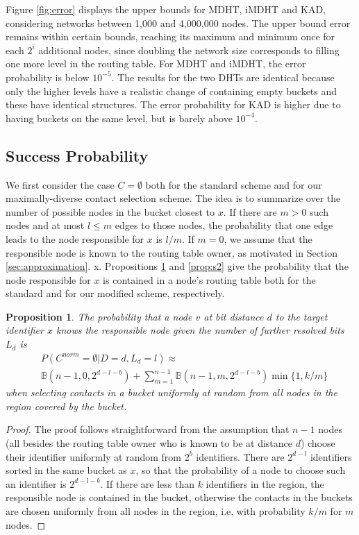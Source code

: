 \documentclass[10pt, conference, compsocconf, letterpaper]{IEEEtran}
\newcommand{\found}{\emptyset}
\renewcommand{\binom}{\mathbb{B}}
\newtheorem{proposition}{Proposition}
\begin{document}
Figure \ref{fig:error} displays the upper bounds for MDHT, iMDHT and KAD, considering networks between 1,000 and 4,000,000 nodes. 
The upper bound error remains within certain bounds, reaching its maximum and minimum once for each $2^i$ additional nodes, since doubling the network size corresponds to filling one more level in the routing table.
For MDHT and iMDHT, the error probability is below $10^{-5}$. The results for the two DHTs are identical because only the higher levels have a realistic change of containing empty buckets and these have identical structures.  
The error probability for KAD is higher due to having buckets on the same level, but is barely above $10^{-4}$.
 

\subsection{Success Probability}
\label{sec:modelsuccess}
We first consider the case $C=\found$ both for the standard scheme and for our maximally-diverse contact selection scheme. 
The idea is to summarize over the number of possible nodes in the bucket closest to $x$.
If there are $m>0$ such nodes and at most $l\leq m$ edges to those nodes, the probability that 
one edge leads to the node responsible for $x$ is $l/m$.
If $m=0$, we assume that the responsible node is known to the routing table owner,
as motivated in Section \ref{sec:approximation}.
x.
Propositions \ref{prop:s1} and \ref{prop:s2} give the probability that the node responsible for $x$
is contained in a node's routing table both for the standard and for our modified scheme, respectively.

\vspace{3pt}
\begin{proposition}
\label{prop:s1}
The probability that a node $v$ at bit distance $d$ to the target identifier $x$ knows the responsible
node given the number of further resolved bits $L_d$ is
\begin{align}
\label{eq:Fstandard}
&P(C^{norm} = \found | D = d,L_d=l)  \approx \\
&\binom(n-1,0,2^{d-l-b}) + 
\sum_{m=1}^{n-1}\binom(n-1,m,2^{d-l-b}) \min\{1, k/m\} \nonumber
\end{align} 
when selecting contacts in a bucket uniformly at random from all nodes in the region covered by
the bucket.
\end{proposition}
\begin{proof}
The proof follows straightforward from the assumption that $n-1$ nodes (all besides the routing
table owner who is known to be at distance $d$) choose their identifier uniformly at random from
$2^{b}$ identifiers. There are $2^{d-l}$ identifiers sorted in the same bucket as $x$, so that
the probability of a node to choose such an identifier is $2^{d-l-b}$.
If there are less than $k$ identifiers in the region, the responsible node is contained in the bucket,
otherwise the contacts in the buckets are chosen uniformly from all nodes in the region, i.e.
with probability $k/m$ for $m$ nodes. \end{proof}
\end{document}
